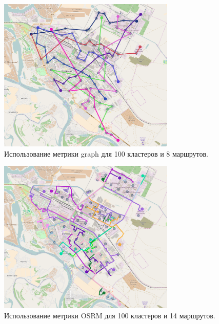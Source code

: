 \documentclass[a4paper, 14pt]{extreport}
\begin{document}
    \begin{figure}[ht!]
        \centering
        \includegraphics[width=0.75\textwidth]{minimal-01}
        \caption{Использование метрики graph для 100 кластеров и 8 маршрутов.}
        \label{fig:network-01}
    \end{figure}

    \begin{figure}[ht!]
        \centering
        \includegraphics[width=0.75\textwidth]{minimal-02}
        \caption{Использование метрики OSRM для 100 кластеров и 14 маршрутов.}
        \label{fig:network-02}
    \end{figure}

    \newpage
\end{document}
